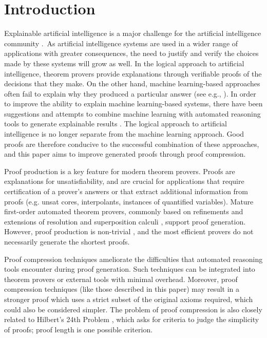 \section{Introduction} 

Explainable artificial intelligence is a major challenge for the artificial intelligence community \cite{bonacina2017automated}.~As artificial intelligence systems are used in a wider range of applications with greater consequences, the need to justify and verify the choices made by these systems will grow as well.
In the logical approach to artificial intelligence, theorem provers provide explanations through verifiable proofs of the decisions that they make.
On the other hand, machine learning-based approaches often fail to explain why they produced a particular answer (see e.g., \cite{miller2019explanation}). 
In order to improve the ability to explain machine learning-based systems, there have been suggestions and attempts to combine machine learning with automated reasoning tools to generate explainable results \cite{bonacina2017automated,siebert2019corg}. 
The logical approach to artificial intelligence is no longer separate from the machine learning approach.
Good proofs are therefore conducive to the successful combination of these approaches, and this paper aims to improve generated proofs through proof compression.

Proof production is a key feature for modern theorem provers. 
Proofs are explanations for unsatisfiability, and are crucial for applications that require certification of a prover's answers or that extract additional information from proofs (e.g. unsat cores, interpolants, instances of quantified variables).
Mature first-order automated theorem provers, commonly based on refinements and extensions of resolution and superposition calculi \cite{Vampire,EProver,Spass,spassT,prover9-mace4}, support proof generation. However, proof production is non-trivial \cite{SchulzAPPA}, and the most efficient provers do not necessarily generate the shortest proofs. 

Proof compression techniques ameliorate the difficulties that automated reasoning tools encounter during proof generation. Such techniques can be integrated into theorem provers or external tools with minimal overhead. Moreover, proof compression techniques (like those described in this paper) may result in a stronger proof which uses a strict subset of the original axioms required, which could also be considered simpler. The problem of proof compression is also closely related to Hilbert's 24th Problem \cite{Hilbert24Problem}, which asks for criteria to judge the simplicity of proofs; proof length is one possible criterion. 


